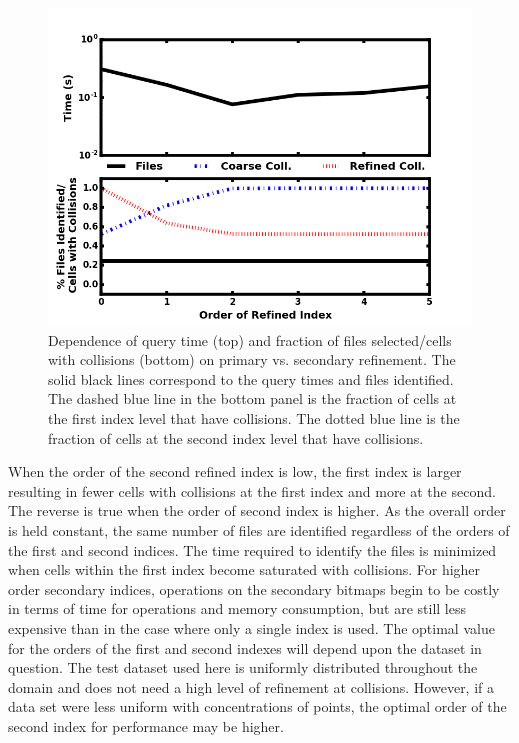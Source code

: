 \documentclass[apjl]{emulateapj}
\begin{document}
\begin{figure}[htbp]
\begin{center}
\includegraphics[width=\columnwidth,keepaspectratio]{../images/vary_order2_np1024_nf512.png}
\caption{Dependence of query time (top) and fraction of files selected/cells with collisions (bottom) on primary vs. secondary refinement. The solid black lines correspond to the query times and files identified. The dashed blue line in the bottom panel is the fraction of cells at the first index level that have collisions. The dotted blue line is the fraction of cells at the second index level that have collisions.}
\label{fig:test_order2}
\end{center}
\end{figure}
%

When the order of the second refined index is low, the first index is larger resulting in fewer cells with collisions at the first index and more at the second. The reverse is true when the order of second index is higher. As the overall order is held constant, the same number of files are identified regardless of the orders of the first and second indices. The time required to identify the files is minimized when cells within the first index become saturated with collisions. For higher order secondary indices, operations on the secondary bitmaps begin to be costly in terms of time for operations and memory consumption, but are still less expensive than in the case where only a single index is used. The optimal value for the orders of the first and second indexes will depend upon the dataset in question. The test dataset used here is uniformly distributed throughout the domain and does not need a high level of refinement at collisions. However, if a data set were less uniform with concentrations of points, the optimal order of the second index for performance may be higher.
\end{document}
